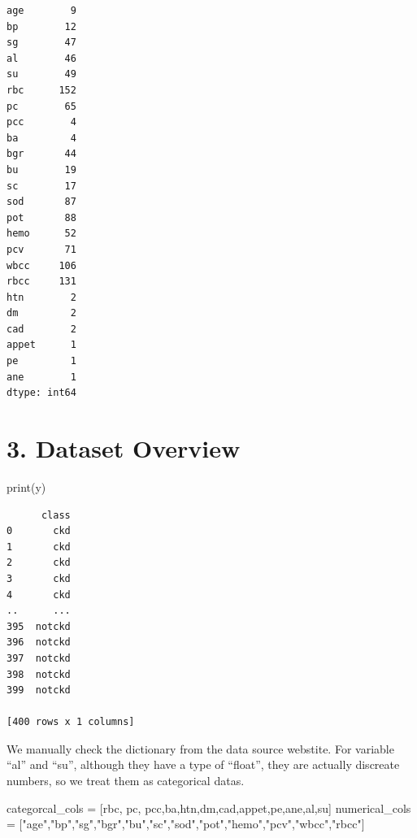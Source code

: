 \documentclass[
  11pt,
  letterpaper,
  DIV=11,
  numbers=noendperiod]{scrartcl}
\newenvironment{Shaded}{\begin{snugshade}}{\end{snugshade}}
\newcommand{\BuiltInTok}[1]{\textcolor[rgb]{0.00,0.23,0.31}{#1}}
\newcommand{\NormalTok}[1]{\textcolor[rgb]{0.00,0.23,0.31}{#1}}
\newcommand{\OperatorTok}[1]{\textcolor[rgb]{0.37,0.37,0.37}{#1}}
\newcommand{\StringTok}[1]{\textcolor[rgb]{0.13,0.47,0.30}{#1}}
\begin{document}
\begin{verbatim}
age        9
bp        12
sg        47
al        46
su        49
rbc      152
pc        65
pcc        4
ba         4
bgr       44
bu        19
sc        17
sod       87
pot       88
hemo      52
pcv       71
wbcc     106
rbcc     131
htn        2
dm         2
cad        2
appet      1
pe         1
ane        1
dtype: int64
\end{verbatim}

\section{3. Dataset Overview}\label{dataset-overview}

\begin{Shaded}
\begin{Highlighting}[]
\BuiltInTok{print}\NormalTok{(y)}
\end{Highlighting}
\end{Shaded}

\begin{verbatim}
      class
0       ckd
1       ckd
2       ckd
3       ckd
4       ckd
..      ...
395  notckd
396  notckd
397  notckd
398  notckd
399  notckd

[400 rows x 1 columns]
\end{verbatim}

We manually check the dictionary from the data source webstite. For
variable ``al'' and ``su'', although they have a type of ``float'', they
are actually discreate numbers, so we treat them as categorical datas.

\begin{Shaded}
\begin{Highlighting}[]
\NormalTok{categorcal\_cols }\OperatorTok{=}\NormalTok{ [}\StringTok{\textquotesingle{}rbc\textquotesingle{}}\NormalTok{, }\StringTok{\textquotesingle{}pc\textquotesingle{}}\NormalTok{, }\StringTok{\textquotesingle{}pcc\textquotesingle{}}\NormalTok{,}\StringTok{\textquotesingle{}ba\textquotesingle{}}\NormalTok{,}\StringTok{\textquotesingle{}htn\textquotesingle{}}\NormalTok{,}\StringTok{\textquotesingle{}dm\textquotesingle{}}\NormalTok{,}\StringTok{\textquotesingle{}cad\textquotesingle{}}\NormalTok{,}\StringTok{\textquotesingle{}appet\textquotesingle{}}\NormalTok{,}\StringTok{\textquotesingle{}pe\textquotesingle{}}\NormalTok{,}\StringTok{\textquotesingle{}ane\textquotesingle{}}\NormalTok{,}\StringTok{\textquotesingle{}al\textquotesingle{}}\NormalTok{,}\StringTok{\textquotesingle{}su\textquotesingle{}}\NormalTok{]}
\NormalTok{numerical\_cols }\OperatorTok{=}\NormalTok{ [}\StringTok{"age"}\NormalTok{,}\StringTok{"bp"}\NormalTok{,}\StringTok{"sg"}\NormalTok{,}\StringTok{"bgr"}\NormalTok{,}\StringTok{"bu"}\NormalTok{,}\StringTok{"sc"}\NormalTok{,}\StringTok{"sod"}\NormalTok{,}\StringTok{"pot"}\NormalTok{,}\StringTok{"hemo"}\NormalTok{,}\StringTok{"pcv"}\NormalTok{,}\StringTok{"wbcc"}\NormalTok{,}\StringTok{"rbcc"}\NormalTok{]}
\end{Highlighting}
\end{Shaded}
\end{document}
